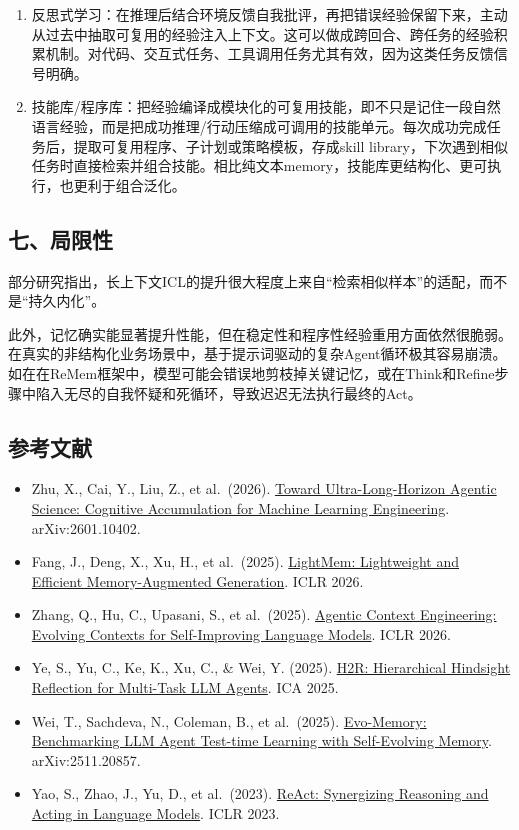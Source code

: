 \begin{enumerate}
\def\labelenumi{\arabic{enumi}.}
\item
  反思式学习：在推理后结合环境反馈自我批评，再把错误经验保留下来，主动从过去中抽取可复用的经验注入上下文。这可以做成跨回合、跨任务的经验积累机制。对代码、交互式任务、工具调用任务尤其有效，因为这类任务反馈信号明确。
\item
  技能库/程序库：把经验编译成模块化的可复用技能，即不只是记住一段自然语言经验，而是把成功推理/行动压缩成可调用的技能单元。每次成功完成任务后，提取可复用程序、子计划或策略模板，存成skill library，下次遇到相似任务时直接检索并组合技能。相比纯文本memory，技能库更结构化、更可执行，也更利于组合泛化。
\end{enumerate}

\hypertarget{ux4e03ux5c40ux9650ux6027}{%
\subsection{七、局限性}\label{ux4e03ux5c40ux9650ux6027}}

部分研究指出，长上下文ICL的提升很大程度上来自``检索相似样本''的适配，而不是``持久内化''。

此外，记忆确实能显著提升性能，但在稳定性和程序性经验重用方面依然很脆弱。在真实的非结构化业务场景中，基于提示词驱动的复杂Agent循环极其容易崩溃。如在在ReMem框架中，模型可能会错误地剪枝掉关键记忆，或在Think和Refine步骤中陷入无尽的自我怀疑和死循环，导致迟迟无法执行最终的Act。

\hypertarget{ux53c2ux8003ux6587ux732e-139}{%
\subsection{参考文献}\label{ux53c2ux8003ux6587ux732e-139}}

\begin{itemize}
\tightlist
\item
  Zhu, X., Cai, Y., Liu, Z., et al.~(2026). \href{https://arxiv.org/abs/2601.10402}{Toward Ultra-Long-Horizon Agentic Science: Cognitive Accumulation for Machine Learning Engineering}. arXiv:2601.10402.
\item
  Fang, J., Deng, X., Xu, H., et al.~(2025). \href{https://arxiv.org/abs/2510.18866}{LightMem: Lightweight and Efficient Memory-Augmented Generation}. ICLR 2026.
\item
  Zhang, Q., Hu, C., Upasani, S., et al.~(2025). \href{https://arxiv.org/abs/2510.04618}{Agentic Context Engineering: Evolving Contexts for Self-Improving Language Models}. ICLR 2026.
\item
  Ye, S., Yu, C., Ke, K., Xu, C., \& Wei, Y. (2025). \href{https://doi.org/10.1109/ICA67499.2025.00030}{H2R: Hierarchical Hindsight Reflection for Multi-Task LLM Agents}. ICA 2025.
\item
  Wei, T., Sachdeva, N., Coleman, B., et al.~(2025). \href{https://arxiv.org/abs/2511.20857}{Evo-Memory: Benchmarking LLM Agent Test-time Learning with Self-Evolving Memory}. arXiv:2511.20857.
\item
  Yao, S., Zhao, J., Yu, D., et al.~(2023). \href{https://arxiv.org/abs/2210.03629}{ReAct: Synergizing Reasoning and Acting in Language Models}. ICLR 2023.
\end{itemize}

